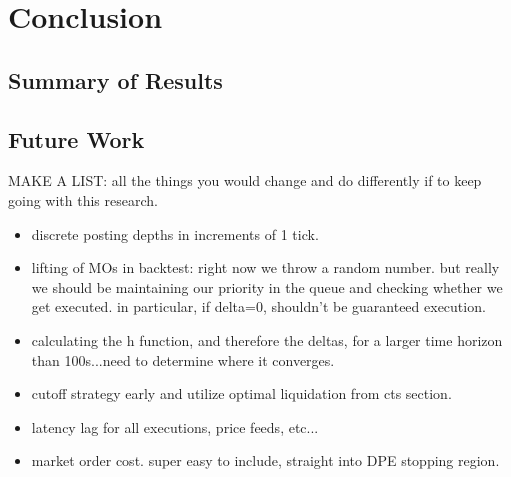 \chapter{Conclusion}

\section{Summary of Results}

\section{Future Work}
MAKE A LIST: all the things you would change and do differently if to keep going with this research.
\begin{itemize}
\item discrete posting depths in increments of 1 tick. 
\item lifting of MOs in backtest: right now we throw a random number. but really we should be maintaining our priority in the queue and checking whether we get executed. in particular, if delta=0, shouldn't be guaranteed execution.
\item calculating the h function, and therefore the deltas, for a larger time horizon than 100s...need to determine where it converges.
\item cutoff strategy early and utilize optimal liquidation from cts section.
\item latency lag for all executions, price feeds, etc...
\item market order cost. super easy to include, straight into DPE stopping region.
\end{itemize}
